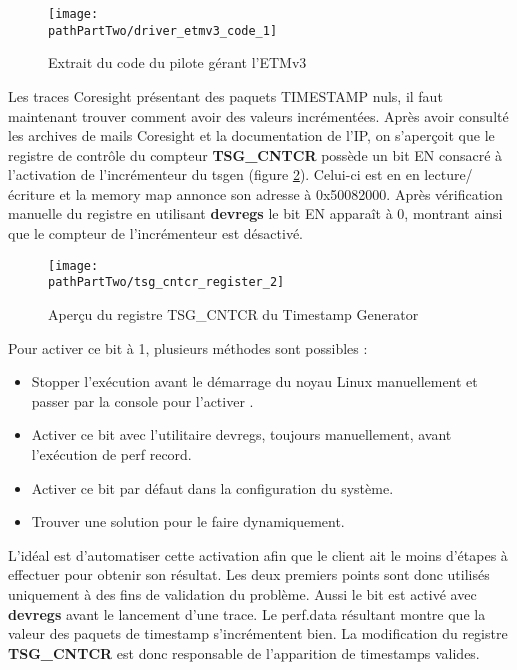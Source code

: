 \begin{figure}[H]
	\begin{center}
		\texttt{[image: \\pathPartTwo/driver\_etmv3\_code\_1]}
		\caption{Extrait du code du pilote gérant l'ETMv3}
	    \label{fig:driver_etmv3_code_1}
	\end{center}
\end{figure}

Les traces Coresight présentant des paquets TIMESTAMP nuls, il faut maintenant
trouver comment avoir des valeurs incrémentées.  Après avoir consulté les
archives de mails Coresight et la documentation de l'IP, on s'aperçoit que le
registre de contrôle du compteur \textbf{TSG\_CNTCR} possède un bit EN
consacré à l'activation de l'incrémenteur du tsgen (figure
\ref{fig:tsg_cntcr_register}). Celui-ci est en en lecture/écriture et la
memory map annonce son adresse à 0x50082000.  Après vérification manuelle du
registre en utilisant \textbf{devregs} le bit EN apparaît à 0, montrant ainsi
que le compteur de l'incrémenteur est désactivé. \\

\begin{figure}[H]
	\begin{center}
		\texttt{[image: \\pathPartTwo/tsg\_cntcr\_register\_2]}
		\caption{Aperçu du registre TSG\_CNTCR du Timestamp Generator}
	    \label{fig:tsg_cntcr_register}
	\end{center}
\end{figure}

Pour activer ce bit à 1, plusieurs méthodes sont possibles :

\begin{itemize}[label=\textbullet]
	\item Stopper l'exécution avant le démarrage du noyau Linux
		manuellement et passer par la console pour l'activer .
	\item Activer ce bit avec l'utilitaire devregs, toujours manuellement,
		avant l'exécution de perf record.
	\item Activer ce bit par défaut dans la configuration du système.
	\item Trouver une solution pour le faire dynamiquement.
\end{itemize}

L'idéal est d'automatiser cette activation afin que le client ait le moins
d'étapes à effectuer pour obtenir son résultat. Les deux premiers points sont
donc utilisés uniquement à des fins de validation du problème. Aussi le bit
est activé avec \textbf{devregs} avant le lancement d'une trace. Le perf.data
résultant montre que la valeur des paquets de timestamp s'incrémentent bien.
La modification du registre \textbf{TSG\_CNTCR} est donc responsable de
l'apparition de timestamps valides. \\

